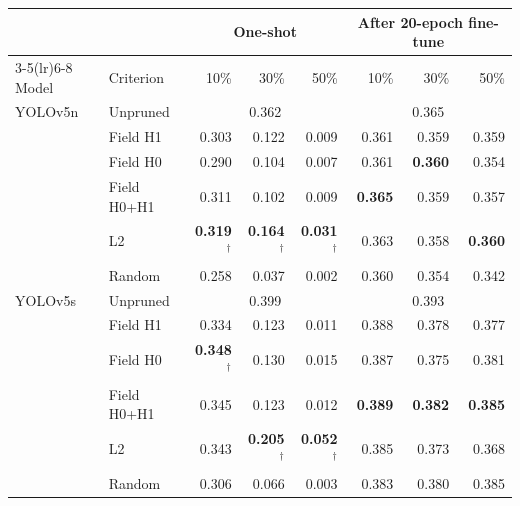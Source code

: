 \begin{tabular}{llrrrrrr}
\toprule
 & & \multicolumn{3}{c}{One-shot} & \multicolumn{3}{c}{After 20-epoch fine-tune} \\
\cmidrule(lr){3-5}\cmidrule(lr){6-8}
Model & Criterion & 10\% & 30\% & 50\% & 10\% & 30\% & 50\% \\
\midrule
YOLOv5n & Unpruned & \multicolumn{3}{c}{0.362} & \multicolumn{3}{c}{0.365} \\
 & Field H1 & 0.303 & 0.122 & 0.009 & 0.361 & 0.359 & 0.359 \\
 & Field H0 & 0.290 & 0.104 & 0.007 & 0.361 & \textbf{0.360} & 0.354 \\
 & Field H0+H1 & 0.311 & 0.102 & 0.009 & \textbf{0.365} & 0.359 & 0.357 \\
 & L2 & \textbf{0.319}$^\dagger$ & \textbf{0.164}$^\dagger$ & \textbf{0.031}$^\dagger$ & 0.363 & 0.358 & \textbf{0.360} \\
 & Random & 0.258 & 0.037 & 0.002 & 0.360 & 0.354 & 0.342 \\
\midrule
YOLOv5s & Unpruned & \multicolumn{3}{c}{0.399} & \multicolumn{3}{c}{0.393} \\
 & Field H1 & 0.334 & 0.123 & 0.011 & 0.388 & 0.378 & 0.377 \\
 & Field H0 & \textbf{0.348}$^\dagger$ & 0.130 & 0.015 & 0.387 & 0.375 & 0.381 \\
 & Field H0+H1 & 0.345 & 0.123 & 0.012 & \textbf{0.389} & \textbf{0.382} & \textbf{0.385} \\
 & L2 & 0.343 & \textbf{0.205}$^\dagger$ & \textbf{0.052}$^\dagger$ & 0.385 & 0.373 & 0.368 \\
 & Random & 0.306 & 0.066 & 0.003 & 0.383 & 0.380 & 0.385 \\
\bottomrule
\end{tabular}
